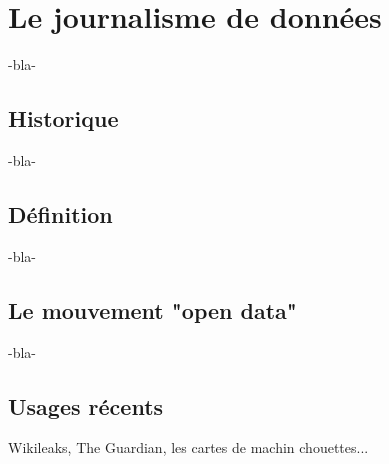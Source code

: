 
\chapter{Le journalisme de données}


-bla-

\section{Historique}



-bla-

\section{Définition}

-bla-

\section{Le mouvement "open data"}

-bla-

\section{Usages récents}

Wikileaks, The Guardian, les cartes de machin chouettes...
